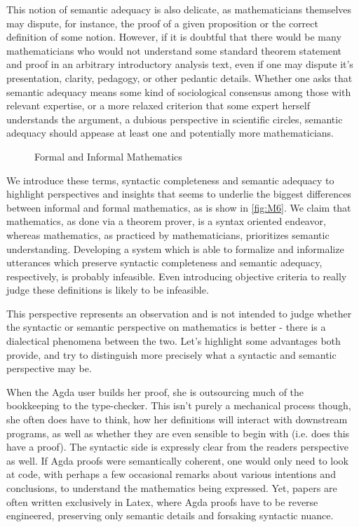 This notion of semantic adequacy is also delicate, as mathematicians themselves
may dispute, for instance, the proof of a given proposition or the correct
definition of some notion. However, if it is doubtful that there would be many
mathematicians who would not understand some standard theorem statement and
proof in an arbitrary introductory analysis text, even if one may dispute it's
presentation, clarity, pedagogy, or other pedantic details. Whether one asks
that semantic adequacy means some kind of sociological consensus among those
with relevant expertise, or a more relaxed criterion that some expert herself
understands the argument, a dubious perspective in scientific circles, semantic
adequacy should appease at least one and potentially more mathematicians.


\begin{figure}[H]
\centering
{}
\caption{Formal and Informal Mathematics} \label{fig:M6}
\end{figure}

We introduce these terms, syntactic completeness and semantic adequacy to
highlight perspectives and insights that seems to underlie the biggest
differences between informal and formal mathematics, as is show in
\autoref{fig:M6}. We claim that mathematics, as done via a theorem prover, is a
syntax oriented endeavor, whereas mathematics, as practiced by mathematicians,
prioritizes semantic understanding. Developing a system which is able to
formalize and informalize utterances which preserve syntactic completeness and
semantic adequacy, respectively, is probably infeasible. Even introducing
objective criteria to really judge these definitions is likely to be infeasible.

This perspective represents an observation and is not intended to judge whether
the syntactic or semantic perspective on mathematics is better - there is a
dialectical phenomena between the two. Let's highlight some advantages both
provide, and try to distinguish more precisely what a syntactic and semantic
perspective may be. 

When the Agda user builds her proof, she is outsourcing much of the bookkeeping
to the type-checker. This isn't purely a mechanical process though, she often
does have to think, how her definitions will interact with downstream programs,
as well as whether they are even sensible to begin with (i.e. does this have a
proof). The syntactic side is expressly clear from the readers perspective as
well. If Agda proofs were semantically coherent, one would only need to look at
code, with perhaps a few occasional remarks about various intentions and
conclusions, to understand the mathematics being expressed. Yet, papers are
often written exclusively in Latex, where Agda proofs have to be reverse
engineered, preserving only semantic details and forsaking syntactic nuance.


